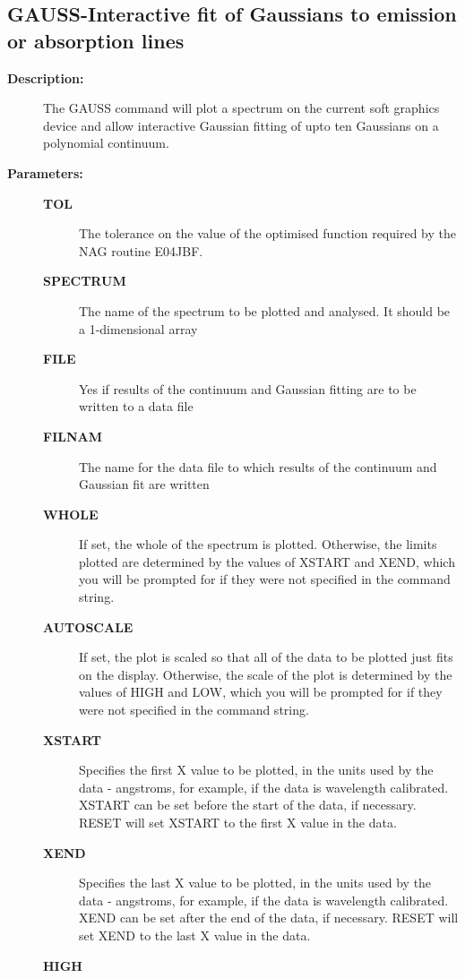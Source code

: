 \subsection{GAUSS-\label{GAUSS}Interactive fit of Gaussians to emission or absorption lines}
\begin{description}

\item [{\bf Description:}]
 The GAUSS command will plot a spectrum on the current
 soft graphics device and allow interactive Gaussian
 fitting of upto ten Gaussians on a polynomial continuum.

\item [{\bf Parameters:}]
\begin{description}
\item [{\bf TOL}]
 The tolerance on the value of the optimised function
 required by the NAG routine E04JBF.
\item [{\bf SPECTRUM}]
 The name of the spectrum to be plotted and analysed.
 It should be a 1-dimensional array
\item [{\bf FILE}]
 Yes if results of the continuum and Gaussian fitting
 are to be written to a data file
\item [{\bf FILNAM}]
 The name for the data file to which results of the
 continuum and Gaussian fit are written
\item [{\bf WHOLE}]
 If set, the whole of the spectrum is plotted.
 Otherwise, the limits plotted are determined by the
 values of XSTART and XEND, which you will be prompted
 for if they were not specified in the command string.
\item [{\bf AUTOSCALE}]
 If set, the plot is scaled so that all of the data
 to be plotted just fits on the display.  Otherwise, the
 scale of the plot is determined by the values of HIGH and
 LOW, which you will be prompted for if they were not
 specified in the command string.
\item [{\bf XSTART}]
 Specifies the first X value to be plotted, in the
 units used by the data - angstroms, for example, if the
 data is wavelength calibrated.  XSTART can be set before
 the start of the data, if necessary.  RESET will set
 XSTART to the first X value in the data.
\item [{\bf XEND}]
 Specifies the last X value to be plotted, in the units
 used by the data - angstroms, for example, if the data
 is wavelength calibrated.  XEND can be set after the end
 of the data, if necessary. RESET will set XEND to the last
 X value in the data.
\item [{\bf HIGH}]

\end{description}
\end{description}
